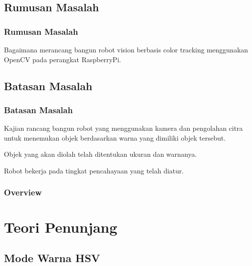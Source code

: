 \documentclass[table,dvipsnames]{beamer}
\begin{document}
\subsection{Rumusan Masalah}

\begin{frame}
\frametitle{Rumusan Masalah}
\begin{block}{}
Bagaimana merancang bangun robot vision berbasis color tracking menggunakan OpenCV pada perangkat RaspberryPi.
\end{block}
\end{frame}

\subsection{Batasan Masalah}

\begin{frame}
\frametitle{Batasan Masalah}
\begin{block}{}
Kajian rancang bangun robot yang menggunakan kamera dan pengolahan citra untuk menemukan objek berdasarkan warna yang dimiliki objek tersebut.
\end{block}
\begin{block}{}
Objek yang akan diolah telah ditentukan ukuran dan warnanya.
\end{block}
\begin{block}{}
Robot bekerja pada tingkat pencahayaan yang telah diatur.
\end{block}
\end{frame}

\begin{frame}
\frametitle{Overview}
\tableofcontents
\end{frame}

\section{Teori Penunjang}

\subsection{Mode Warna HSV}
\end{document}
